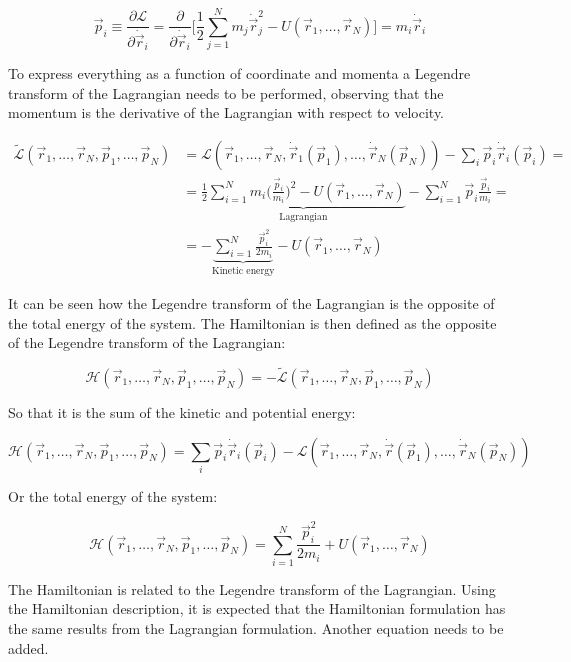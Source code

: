 $$\vec{p}_i\equiv\frac{\partial\mathcal{L}}{\partial\dot{\vec{r}}_i} = \frac{\partial}{\partial\dot{\vec{r}}_i}\biggl[\frac{1}{2}\sum\limits_{j=1}^Nm_j\dot{\vec{r}}_j^2 - U(\vec{r}_1, \dots, \vec{r}_N)\biggr] = m_i\dot{\vec{r}}_i$$

To express everything as a function of coordinate and momenta a Legendre transform of the Lagrangian needs to be performed, observing that the momentum is the derivative of the Lagrangian with respect to velocity.

\begin{align*}
	\tilde{\mathcal{L}}(\vec{r}_1, \dots, \vec{r}_N, \vec{p}_1, \dots, \vec{p}_N) &= \mathcal{L}(\vec{r}_1, \dots, \vec{r}_N, \dot{\vec{r}}_1(\vec{p}_1), \dots, \dot{\vec{r}}_N(\vec{p}_N))-\sum\limits_{i}\vec{p}_i\dot{\vec{r}}_i(\vec{p}_i) = \\
																																								&=\underbrace{\frac{1}{2}\sum\limits_{i=1}^Nm_i\biggl(\frac{\vec{p}_i}{m_i}\biggr)^2-U(\vec{r}_1, \dots, \vec{r}_N)}_{\text{Lagrangian}}-\sum\limits_{i=1}^N\vec{p}_i\frac{\vec{p}_i}{m_i} = \\
																																								&=-\underbrace{\sum\limits_{i=1}^N\frac{\vec{p}_i^2}{2m_i}}_{\text{Kinetic energy}} - U(\vec{r}_1, \dots, \vec{r}_N)
\end{align*}

It can be seen how the Legendre transform of the Lagrangian is the opposite of the total energy of the system.
The Hamiltonian is then defined as the opposite of the Legendre transform of the Lagrangian:

$$\mathcal{H}(\vec{r}_1, \dots, \vec{r}_N, \vec{p}_1, \dots, \vec{p}_N) = -\tilde{\mathcal{L}}(\vec{r}_1, \dots, \vec{r}_N, \vec{p}_1, \dots, \vec{p}_N)$$

So that it is the sum of the kinetic and potential energy:

$$\mathcal{H}(\vec{r}_1, \dots, \vec{r}_N, \vec{p}_1, \dots, \vec{p}_N) = \sum\limits_i\vec{p}_i\dot{\vec{r}}_i(\vec{p}_i) - \mathcal{L}(\vec{r}_1, \dots, \vec{r}_N, \dot{\vec{r}}(\vec{p}_1), \dots, \dot{\vec{r}}_N(\vec{p}_N))$$

Or the total energy of the system:

$$\mathcal{H}(\vec{r}_1, \dots, \vec{r}_N, \vec{p}_1, \dots, \vec{p}_N) = \sum\limits_{i=1}^N\frac{\vec{p}_i^2}{2m_i} + U(\vec{r}_1, \dots, \vec{r}_N)$$

The Hamiltonian is related to the Legendre transform of the Lagrangian.
Using the Hamiltonian description, it is expected that the Hamiltonian formulation has the same results from the Lagrangian formulation.
Another equation needs to be added.

